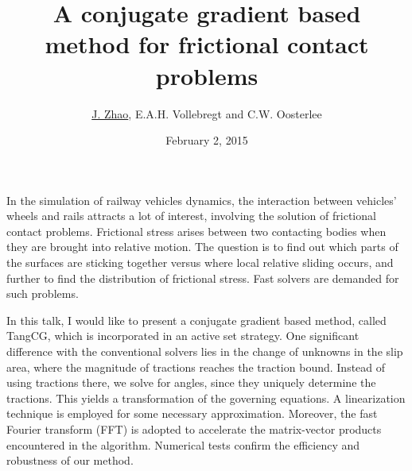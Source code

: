 \documentclass{article}
\title{A conjugate gradient based method for frictional contact problems}
\author{\underline{J. Zhao}, E.A.H. Vollebregt and C.W. Oosterlee}
\affil{Delft Universiry of Technology}
\date{February 2, 2015}
\begin{document}
\maketitle

\setcounter{page}{9}
In the simulation of railway vehicles dynamics, the interaction between vehicles' wheels and rails attracts a lot of interest, involving the solution of frictional contact problems. Frictional stress arises between two contacting bodies when they are brought into relative motion. The question is to find out which parts of the surfaces are sticking together versus where local relative sliding occurs, and further to find the distribution of frictional stress. Fast solvers are demanded for such problems.


In this talk, I would like to present a conjugate gradient based method, called TangCG, which is incorporated in an active set strategy. One significant difference with the conventional solvers lies in the change of unknowns in the slip area, where the magnitude of tractions reaches the traction bound. Instead of using tractions there, we solve for angles, since they uniquely determine the tractions. This yields a transformation of the governing equations. A linearization technique is employed for some necessary approximation. Moreover, the fast Fourier transform (FFT) is adopted to accelerate the matrix-vector products encountered in the algorithm. Numerical tests confirm the efficiency and robustness of our method. 
\end{document}
